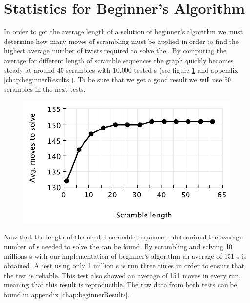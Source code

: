 \section{Statistics for Beginner's Algorithm}
\label{sec:beginnersStat}
In order to get the average length of a solution of beginner's algorithm we must determine how many moves of scrambling must be applied in order to find the highest average number of twists required to solve the \cube{}.
By computing the average for different length of scramble sequences the graph quickly becomes steady at around 40 scrambles with 10.000 tested \cube{}s (see figure \ref{fig:beginnersScramble} and appendix \ref{chap:beginnerResults}). To be sure that we get a good result we will use 50 scrambles in the next tests.
\begin{figure}[htbp]
	\centering
		\includegraphics[scale=0.6]{input/pics/beginnersScramble.pdf}
	\caption{}
	\label{fig:beginnersScramble}
\end{figure}

Now that the length of the needed scramble sequence is determined the average number of \twist{}s needed to solve the \cube{} can be found.
By scrambling and solving 10 millions \cube{}s with our implementation of beginner's algorithm an average of 151 \twist{}s is obtained.
A test using only 1 million \rubik{}s is run three times in order to ensure that the test is reliable.
This test also showed an average of 151 moves in every run, meaning that this result is reproducible.
The raw data from both tests can be found in appendix \ref{chap:beginnerResults}.

